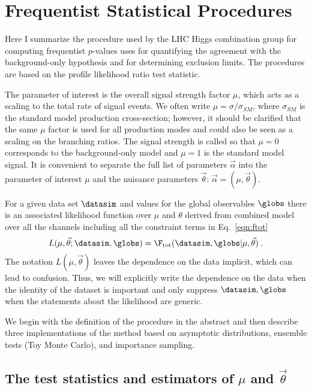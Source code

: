 \section{Frequentist Statistical Procedures}
\label{UE:Inputs} 

Here I summarize the procedure used by the LHC Higgs combination group  for computing frequentist  $p$-values uses for 
quantifying the agreement with the background-only hypothesis and for determining exclusion limits.  
The procedures are based on the profile likelihood ratio test statistic.  


The parameter of interest is the overall signal strength factor $\mu$, which acts as a scaling to the total rate of signal events.  We often write $\mu=\sigma/\sigma_{SM}$, where $\sigma_{SM}$ is the standard model production cross-section; however, it should be clarified that the same $\mu$ factor is used for all production modes and could also be seen as a scaling on the branching ratios.  The signal strength is called so that $\mu=0$ corresponds to the background-only model and $\mu=1$ is the standard model signal.  It is convenient to separate the full list of parameters $\vec\alpha$ into the parameter of interest $\mu$ and the nuisance parameters $\vec\theta$: $\vec\alpha=(\mu,\vec\theta)$.


For a given data set $\datasim$ and values for the global observables $\globs$ there is an associated likelihood function over $\mu$ and $\theta$ derived from combined model over all the channels including all the constraint terms in Eq.~\ref{eqn:ftot}
\begin{equation}
L(\mu,\vec\theta;\datasim,\globs) = \F_{\rm tot}(\datasim,\globs|\mu,\vec\theta) \;.
\end{equation}
The notation $L(\mu,\vec\theta)$ leaves the dependence on the data implicit, which can lead to confusion.  Thus, we will explicitly write the dependence on the data when the identity of the dataset is important and only suppress $\datasim,\globs$ when the statements about the likelihood are generic.


We begin with the definition of the procedure in the abstract and then describe three implementations of the method based on asymptotic distributions, ensemble tests (Toy Monte Carlo),  and importance sampling.


\subsection{The test statistics and estimators of $\mu$ and $\vec\theta$}


